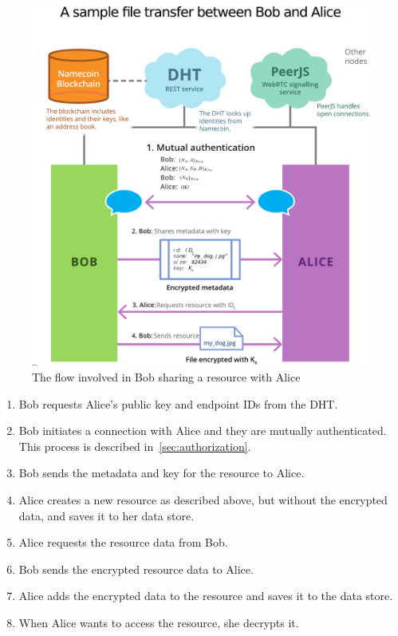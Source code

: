 \begin{figure}[ht]
\centering
\includegraphics[width=\textwidth,height=0.4\paperheight,keepaspectratio
]{figures/flow}
\caption{The flow involved in Bob sharing a resource with Alice}
\label{fig:flow}
\end{figure}
\begin{enumerate}
  \item Bob requests Alice's public key and endpoint IDs from the DHT.
  \item Bob initiates a connection with Alice and they are mutually authenticated. This process is described in~\ref{sec:authorization}.
  \item Bob sends the metadata and key for the resource to Alice.
  \item Alice creates a new resource as described above, but without the encrypted data, and saves it to her data store.
  \item Alice requests the resource data from Bob.
  \item Bob sends the encrypted resource data to Alice.
  \item Alice adds the encrypted data to the resource and saves it to the data store.
  \item When Alice wants to access the resource, she decrypts it.
\end{enumerate}


